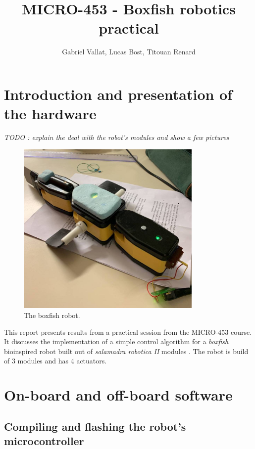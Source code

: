 \documentclass[11pt]{article}
\title{MICRO-453 - Boxfish robotics practical}
\author{Gabriel Vallat, Lucas Bost, Titouan Renard}
\begin{document}
\maketitle
\tableofcontents
\section{Introduction and presentation of the hardware}

\textit{TODO : explain the deal with the robot's modules and show a few pictures} 

\begin{figure}[h!]
    \centering
    \includegraphics[width=0.8\textwidth]{figures/boxfish.jpg}
    \caption{The boxfish robot.}
    \label{boxfish}
\end{figure}

This report presents results from a practical session from the MICRO-453 course. It discusses the implementation of a simple control algorithm for a \textit{boxfish} bioinspired robot built out of \textit{salamadra robotica II} modules \cite{salamadra_robotica_2}. The robot is build of $3$ modules and has $4$ actuators.

\section{On-board and off-board software}


\subsection{Compiling and flashing the robot's microcontroller}
\end{document}
